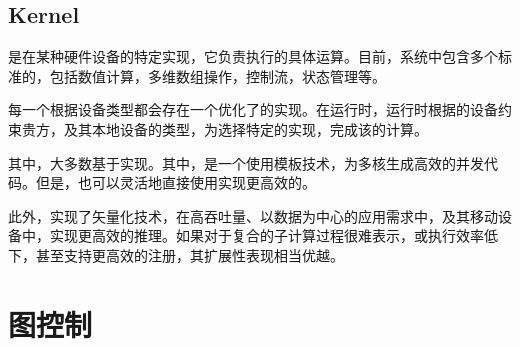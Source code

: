 \begin{content}
\subsection{Kernel}

是在某种硬件设备的特定实现，它负责执行的具体运算。目前，系统中包含多个标准的，包括数值计算，多维数组操作，控制流，状态管理等。

每一个根据设备类型都会存在一个优化了的实现。在运行时，运行时根据的设备约束贵方，及其本地设备的类型，为选择特定的实现，完成该的计算。

其中，大多数基于实现。其中，是一个使用模板技术，为多核生成高效的并发代码。但是，也可以灵活地直接使用实现更高效的。

此外，实现了矢量化技术，在高吞吐量、以数据为中心的应用需求中，及其移动设备中，实现更高效的推理。如果对于复合的子计算过程很难表示，或执行效率低下，甚至支持更高效的注册，其扩展性表现相当优越。

\end{content}

\section{图控制}

